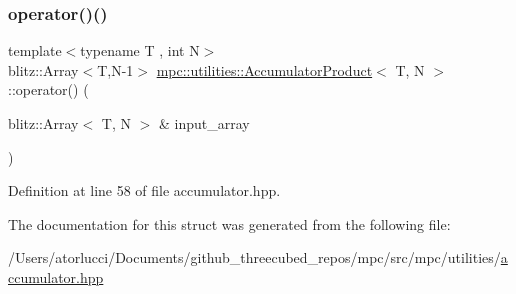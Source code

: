 \subsubsection{\texorpdfstring{operator()()}{operator()()}}
{\footnotesize\ttfamily template$<$typename T , int N$>$ \\
blitz\+::\+Array$<$T,N-\/1$>$ \mbox{\hyperlink{structmpc_1_1utilities_1_1_accumulator_product}{mpc\+::utilities\+::\+Accumulator\+Product}}$<$ T, N $>$\+::operator() (\begin{DoxyParamCaption}\item[{blitz\+::\+Array$<$ T, N $>$ \&}]{input\+\_\+array }\end{DoxyParamCaption})\hspace{0.3cm}{\ttfamily [inline]}}



Definition at line 58 of file accumulator.\+hpp.



The documentation for this struct was generated from the following file\+:\begin{DoxyCompactItemize}
\item 
/\+Users/atorlucci/\+Documents/github\+\_\+threecubed\+\_\+repos/mpc/src/mpc/utilities/\mbox{\hyperlink{accumulator_8hpp}{accumulator.\+hpp}}\end{DoxyCompactItemize}
